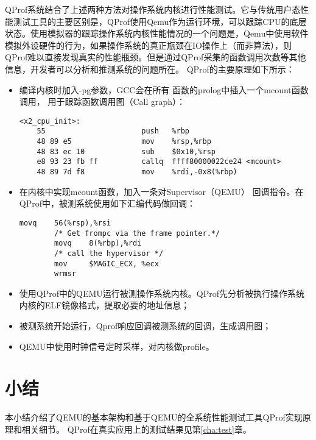 	QProf系统结合了上述两种方法对操作系统内核进行性能测试。它与传统用户态性能测试工具的主要区别是，QProf使用Qemu作为运行环境，可以跟踪CPU的底层状态。使用模拟器的跟踪操作系统内核性能情况的一个问题是，Qemu中使用软件模拟外设硬件的行为，如果操作系统的真正瓶颈在IO操作上（而非算法），则QProf难以直接发现真实的性能瓶颈。但是通过QProf采集的函数调用次数等其他信息，开发者可以分析和推测系统的问题所在。 QProf的主要原理如下所示：
	\begin{itemize}
		\item 编译内核时加入-pg参数，GCC会在所有
			函数的prolog中插入一个mcount函数调用，
			用于跟踪函数调用图（Call graph）：
\begin{lstlisting}[language={[x86masm]Assembler}, caption=加入-pg编译参数后的函数序言]
<x2_cpu_init>:                                                 
	55                      push   %rbp                     
	48 89 e5                mov    %rsp,%rbp                
	48 83 ec 10             sub    $0x10,%rsp               
	e8 93 23 fb ff          callq  ffff80000022ce24 <mcount>
	48 89 7d f8             mov    %rdi,-0x8(%rbp)          
\end{lstlisting}

		\item 在内核中实现mcount函数，加入一条对Supervisor（QEMU）
			回调指令。在QProf中，被测系统使用如下汇编代码做回调：
\begin{Code}

\begin{lstlisting}[caption=QProf中mcount函数实现]
        movq    56(%rsp),%rsi
        /* Get frompc via the frame pointer.*/
        movq    8(%rbp),%rdi
        /* call the hypervisor */
        mov     $MAGIC_ECX, %ecx
        wrmsr
\end{lstlisting}
\end{Code}
		\item
		使用QProf中的QEMU运行被测操作系统内核。QProf先分析被执行操作系统内核的ELF镜像格式，提取必要的地址信息；
		\item 被测系统开始运行，Qprof响应回调被测系统的回调，生成调用图；
		\item QEMU中使用时钟信号定时采样，对内核做profile。
	\end{itemize}

\section{小结}

本小结介绍了QEMU的基本架构和基于QEMU的全系统性能测试工具QProf实现原理和相关细节。
QProf在真实应用上的测试结果见第\ref{cha:test}章。
